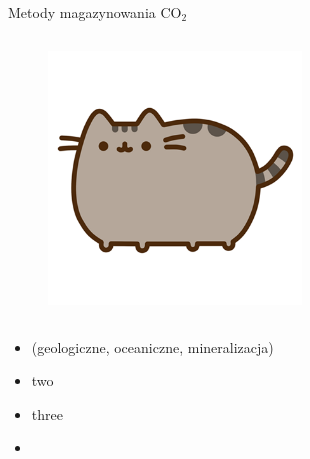 \begin{columnframe}{Metody magazynowania CO$_2$}
    \begin{column}{0.5\textwidth}
        \begin{figure}
            \centering
            \includegraphics[width=0.6\textwidth, frame]{images/pusheen.png}
        \end{figure}
    \end{column}
    \begin{column}{0.5\textwidth}
        \begin{itemize}
            \item (geologiczne, oceaniczne, mineralizacja)
            \item two \MeV
            \item three \GeV
            \item \aegis
        \end{itemize}
    \end{column}
\end{columnframe}

